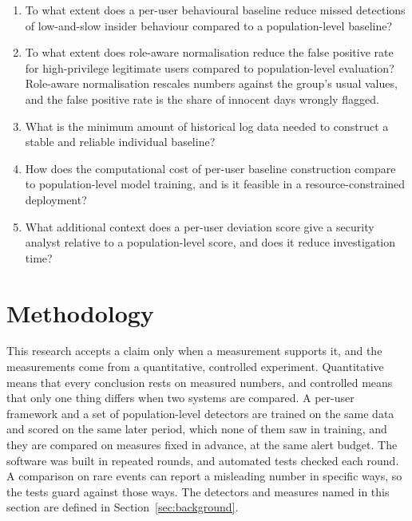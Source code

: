 \documentclass[a4paper,12pt]{article}
\begin{document}
\begin{enumerate}
   \item[\textbf{SQ1}] To what extent does a per-user behavioural baseline reduce missed detections of low-and-slow insider behaviour compared to a population-level baseline?
   \item[\textbf{SQ2}] To what extent does role-aware normalisation reduce the false positive rate for high-privilege legitimate users compared to population-level evaluation? Role-aware normalisation rescales numbers against the group's usual values, and the false positive rate is the share of innocent days wrongly flagged.
   \item[\textbf{SQ3}] What is the minimum amount of historical log data needed to construct a stable and reliable individual baseline?
   \item[\textbf{SQ4}] How does the computational cost of per-user baseline construction compare to population-level model training, and is it feasible in a resource-constrained deployment?
   \item[\textbf{SQ5}] What additional context does a per-user deviation score give a security analyst relative to a population-level score, and does it reduce investigation time?
\end{enumerate}


\section{Methodology}
\label{sec:methodology}

This research accepts a claim only when a measurement supports it, and the measurements come from a quantitative, controlled experiment. Quantitative means that every conclusion rests on measured numbers, and controlled means that only one thing differs when two systems are compared. A per-user framework and a set of population-level detectors are trained on the same data and scored on the same later period, which none of them saw in training, and they are compared on measures fixed in advance, at the same alert budget. The software was built in repeated rounds, and automated tests checked each round. A comparison on rare events can report a misleading number in specific ways, so the tests guard against those ways. The detectors and measures named in this section are defined in Section~\ref{sec:background}.
\end{document}
